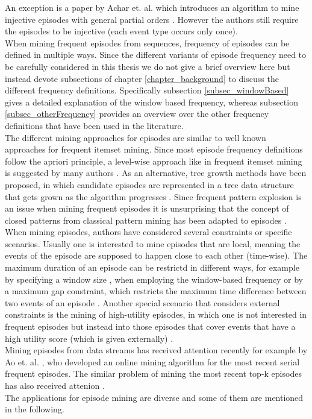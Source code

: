 An exception is a paper by Achar et. al. which introduces an algorithm to mine injective episodes with general partial orders \cite{achar2012discovering}. However the authors still require the episodes to be injective (each event type occurs only once). \\
When mining frequent episodes from sequences, frequency of episodes can be defined in multiple ways. Since the different variants of episode frequency need to be carefully considered in this thesis we do not give a brief overview here but instead devote subsections of chapter \ref{chapter_background} to discuss the different frequency definitions. Specifically subsection \ref{subsec_windowBased} gives a detailed explanation of the window based frequency, whereas subsection \ref{subsec_otherFrequency} provides an overview over the other frequency definitions that have been used in the literature. \\
The different mining approaches for episodes are similar to well known approaches for frequent itemset mining. Since most episode frequency definitions follow the apriori principle, a level-wise approach like in frequent itemset mining \cite{agrawal1993mining} is suggested by many authors \cite{mannila1995discovering} \cite{laxman2006discovering}. As an alternative, tree growth methods have been proposed, in which candidate episodes are represented in a tree data structure that gets grown as the algorithm progresses \cite{baumgarten2003tree}. Since frequent pattern explosion is an issue when mining frequent episodes it is unsurprising that the concept of closed patterns from classical pattern mining \cite{wang2003closet+} has been adapted to episodes \cite{zhou2010mining} \cite{tatti2011mining}. \\
When mining episodes, authors have considered several constraints or specific scenarios. Usually one is interested to mine episodes that are local, meaning the events of the episode are supposed to happen close to each other (time-wise). The maximum duration of an episode can be restrictd in different ways, for example by specifying a window size \cite{mannila1995discovering}, when employing the window-based frequency or by a maximum gap constraint, which restricts the maximum time difference between two events of an episode \cite{meger2004constraint}. Another special scenario that considers external constraints is the mining of high-utility episodes, in which one is not interested in frequent episodes but instead into those episodes that cover events that have a high utility score (which is given externally) \cite{wu2013mining}. \\
Mining episodes from data streams has received attention recently for example by Ao et. al. \cite{ao2015online}, who developed an online mining algorithm for the most recent serial frequent episodes. The similar problem of mining the most recent top-k episodes has also received attenion \cite{patnaik2012efficient}.\\
The applications for episode mining are diverse and some of them are mentioned in the following.

